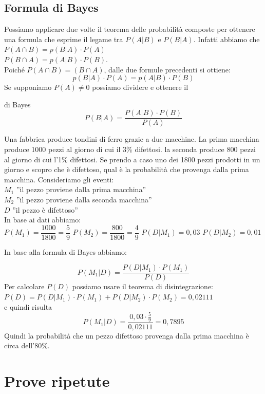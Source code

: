 \subsection{Formula di Bayes}
Possiamo applicare due volte il teorema delle probabilità composte per 
ottenere 
una formula che esprime il legame tra $P(A|B)$ e $P(B|A)$.
Infatti abbiamo che \\
$P(A\cap B)=p(B|A)\cdot P(A)$ \\
$P(B\cap A)=p(A|B)\cdot P(B)$.\\
Poiché $P(A\cap B) = (B\cap A)$, dalle due formule precedenti si ottiene:
$$p(B|A)\cdot P(A) = p(A|B)\cdot P(B)$$
Se supponiamo $P(A) \neq 0$ possiamo dividere e ottenere il
\begin{teorema}{di Bayes}
$$P(B|A)=\dfrac{P(A|B)\cdot P(B)}{P(A)}$$ 
\end{teorema} 


\begin{esempio}
Una fabbrica produce tondini di ferro grazie a due macchine. La prima 
macchina 
produce 1000 pezzi al giorno di cui il 3\% difettosi. la seconda produce 800 
pezzi al giorno di cui l'1\% difettosi. Se prendo a caso uno dei 1800 pezzi 
prodotti in un giorno e scopro che è difettoso, qual è la probabilità che 
provenga dalla prima macchina.
Consideriamo gli eventi:\\
$M_1$ ''il pezzo proviene dalla prima macchina''\\
$M_2$ ''il pezzo proviene dalla seconda macchina''\\
$D$ ''il pezzo è difettoso''\\
In base ai dati abbiamo:\\
$P(M_1)=\dfrac{1000}{1800}=\dfrac{5}{9}$
$P(M_2)=\dfrac{800}{1800}=\dfrac{4}{9}$
$P(D|M_1)=0,03$
$P(D|M_2)=0,01$
\end{esempio}

In base alla formula di Bayes abbiamo:

$$P(M_1|D)=\dfrac{P(D|M_1)\cdot P(M_1)}{P(D)}$$
Per calcolare $P(D)$ possiamo usare il teorema di disintegrazione:\\
$P(D)=P(D|M_1)\cdot P(M_1) + P(D|M_2)\cdot P(M_2)=0,02111$\\
e quindi risulta 
$$P(M_1|D)=\dfrac{0,03 \cdot \frac{5}{9}}{0,02111}=0,7895$$
Quindi la probabilità che un pezzo difettoso provenga dalla prima macchina è 
circa dell'80\%.

\section{Prove ripetute}

